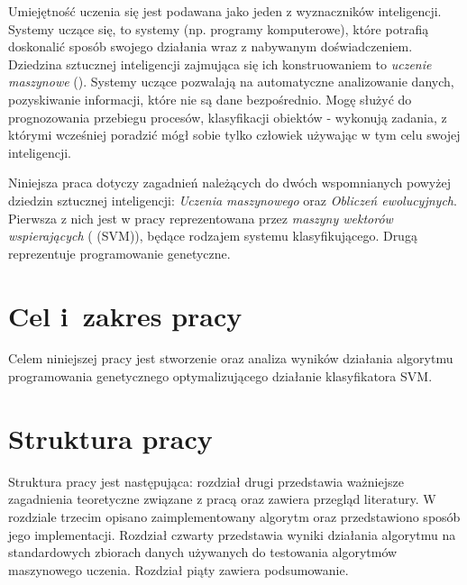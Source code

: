 Umiejętność uczenia się jest podawana jako jeden z wyznaczników inteligencji. Systemy uczące się, to systemy (np. programy komputerowe), które potrafią doskonalić sposób swojego działania wraz z nabywanym doświadczeniem. Dziedzina sztucznej inteligencji zajmująca się ich konstruowaniem to \emph{uczenie maszynowe} (). Systemy uczące pozwalają na automatyczne analizowanie danych, pozyskiwanie informacji, które nie są dane bezpośrednio. Mogę służyć do prognozowania przebiegu procesów, klasyfikacji obiektów - wykonują zadania, z którymi wcześniej poradzić mógł sobie tylko człowiek używając w tym celu swojej inteligencji.

Niniejsza praca dotyczy zagadnień należących do dwóch wspomnianych powyżej dziedzin sztucznej inteligencji: \emph{Uczenia maszynowego} oraz \emph{Obliczeń ewolucyjnych}. Pierwsza z nich jest w pracy reprezentowana przez \emph{maszyny wektorów wspierających} ( (SVM)), będące rodzajem systemu klasyfikującego. Drugą reprezentuje programowanie genetyczne.


\section{Cel i~zakres pracy}
Celem niniejszej pracy jest stworzenie oraz analiza wyników działania algorytmu programowania genetycznego optymalizującego działanie klasyfikatora SVM.

\section{Struktura pracy}
Struktura pracy jest następująca: rozdział drugi przedstawia ważniejsze zagadnienia teoretyczne związane z pracą oraz zawiera przegląd literatury.
W rozdziale trzecim opisano zaimplementowany algorytm oraz przedstawiono sposób jego implementacji. 
Rozdział czwarty przedstawia wyniki działania algorytmu na standardowych zbiorach danych używanych do testowania algorytmów maszynowego uczenia. 
Rozdział piąty zawiera podsumowanie.


